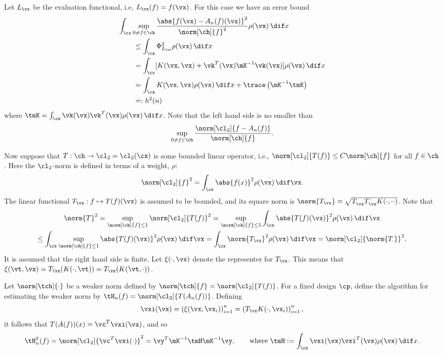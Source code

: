 \documentclass[11pt]{amsart}
\theoremstyle{definition}
\begin{document}
Let $L_{\vx}$ be the evaluation functional, i.e, $L_{\vx}(f)=f(\vx)$.  For this case we have an error bound
\begin{align} \label{errexpress}
\MoveEqLeft{\int_{\cx} \sup_{0 \ne f \in \ch} \frac{\abs{f(\vx) - A_n(f)(\vx)}^2}{\norm[\ch]{f}^2} \rho(\vx) \, \dif x}\\
\nonumber
 &\le \int_{\cx} \Phi_{L_{\vx}}^2 \rho(\vx) \, \dif x \\
\nonumber
& = \int_{\cx} [K(\vx,\vx) + \vk^T(\vx)\mK^{-1} \vk(\vx) ] \rho(\vx) \, \dif x\\
\nonumber
& = \int_{\cx} K(\vx,\vx) \rho(\vx) \, \dif x + \trace\left( \mK^{-1} \tmK \right) \\
\nonumber
&=: h^2(n)
\end{align}
where $\tmK=\int_{\cx} \vk(\vx) \vk^T(\vx) \rho(\vx) \, \dif x$.
Note that the left hand side is no smaller than
\[
\sup_{0 \ne f \in \ch} \frac{\norm[\cl_2]{f-A_n(f)}}{\norm[\ch]{f}}.
\]

Now suppose that $T:\ch \to \cl_2=\cl_2(\cx)$ is some bounded linear operator, i.e., $\norm[\cl_2]{T(f)} \le C\norm[\ch]{f}$ for all $f \in \ch$.  Here the $\cl_2$-norm is defined in terms of a weight, $\rho$:
\[
\norm[\cl_2]{f}^2=\int_{\cx} \abs{f(x)}^2 \rho(\vx) \, \dif \vx.
\]
The linear functional $T_{\vx} : f \mapsto T(f)(\vx)$ is assumed to be bounded, and its square norm is $\norm{T_{\vx}}=\sqrt{T^{\cdot}_{\vx}T^{\cdot \cdot}_{\vx} K(\cdot,\cdot\cdot)}$. Note that
\begin{multline*}
\norm{T}^2 = \sup_{\norm[\ch]{f} \le 1} \norm[\cl_2]{T(f)}^2
= \sup_{\norm[\ch]{f} \le 1} \int_{\cx} \abs{T(f)(\vx)}^2 \rho(\vx) \, \dif \vx \\
\le \int_{\cx} \sup_{\norm[\ch]{f} \le 1}  \abs{T(f)(\vx)}^2  \rho(\vx) \, \dif \vx
= \int_{\cx} \norm{T_{\vx}}^2  \rho(\vx) \, \dif \vx =\norm[\cl_2]{\norm{T_{\cdot}}}^2.
\end{multline*}
It is assumed that the right hand side is finite.  Let $\xi(\cdot,\vx)$ denote the representer for $T_{\vx}$.  This means that $\xi(\vt,\vx)=T_{\vx}(K(\cdot,\vt))=T_{\vx}(K(\vt,\cdot))$.

Let $\norm[\tch]{\cdot}$ be a weaker norm defined by $\norm[\tch]{f} = \norm[\cl_2]{T(f)}$.  For a fixed design $\cp$, define the algorithm for estimating the weaker norm by $\tH_n(f)= \norm[\cl_2]{T(A_n(f))}$.  Defining
\[
\vxi(\vx)=\left(\xi(\vx,\vx_i) \right)_{i=1}^n=\left(T_{\vx}K(\cdot,\vx_i) \right)_{i=1}^n,
\]
it follows that $T(A(f))(x)=\vc^T\vxi(\vx)$, and so
\begin{equation*}
\tH_n^2(f) = \norm[\cl_2]{\vc^T\vxi(\cdot)}^2 = \vy^T \mK^{-1} \tmH \mK^{-1}\vy, \qquad \text{where }\tmH := \int_{\cx} \vxi(\vx) \vxi^T(\vx) \rho(\vx) \, \dif x.
\end{equation*}
\end{document}
